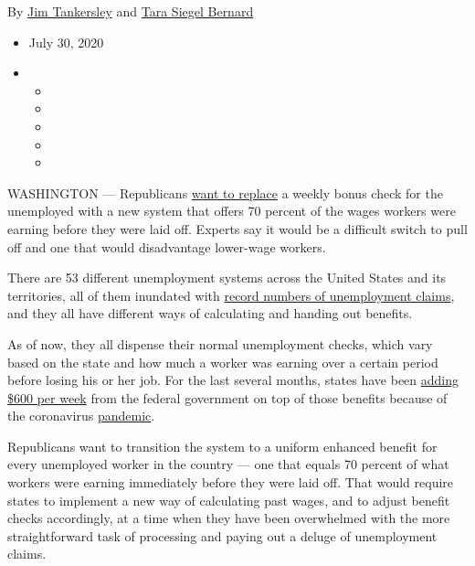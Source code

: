 By \href{https://www.nytimes3xbfgragh.onion/by/jim-tankersley}{Jim
Tankersley} and
\href{https://www.nytimes3xbfgragh.onion/by/tara-siegel-bernard}{Tara
Siegel Bernard}

\begin{itemize}
\item
  July 30, 2020
\item
  \begin{itemize}
  \item
  \item
  \item
  \item
  \item
  \end{itemize}
\end{itemize}

WASHINGTON --- Republicans
\href{https://www.nytimes3xbfgragh.onion/2020/07/23/business/economy/unemployment-benefits.html}{want
to replace} a weekly bonus check for the unemployed with a new system
that offers 70 percent of the wages workers were earning before they
were laid off. Experts say it would be a difficult switch to pull off
and one that would disadvantage lower-wage workers.

There are 53 different unemployment systems across the United States and
its territories, all of them inundated with
\href{https://www.nytimes3xbfgragh.onion/interactive/2020/05/08/business/economy/april-jobs-report.html}{record
numbers of unemployment claims}, and they all have different ways of
calculating and handing out benefits.

As of now, they all dispense their normal unemployment checks, which
vary based on the state and how much a worker was earning over a certain
period before losing his or her job. For the last several months, states
have been
\href{https://www.nytimes3xbfgragh.onion/2020/07/29/business/economy/unemployment-benefits-coronavirus.html}{adding
\$600 per week} from the federal government on top of those benefits
because of the coronavirus
\href{https://www.nytimes3xbfgragh.onion/2020/07/21/business/economy/coronavirus-unemployment-benefits.html}{pandemic}.

Republicans want to transition the system to a uniform enhanced benefit
for every unemployed worker in the country --- one that equals 70
percent of what workers were earning immediately before they were laid
off. That would require states to implement a new way of calculating
past wages, and to adjust benefit checks accordingly, at a time when
they have been overwhelmed with the more straightforward task of
processing and paying out a deluge of unemployment claims.

